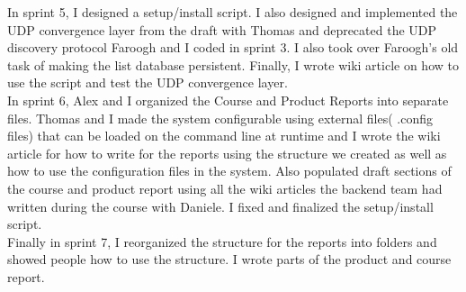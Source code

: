 In sprint 5,
I designed a setup/install script.
I also designed and implemented the UDP convergence layer from the draft with Thomas and deprecated the UDP discovery protocol Faroogh and I coded in sprint 3. 
I also took over Faroogh's old task of making the list database persistent. 
Finally, I wrote wiki article on how to use the script and test the UDP convergence layer. \\

In sprint 6,
Alex and I organized the Course and Product Reports into separate files.
Thomas and I made the system configurable using external files( .config files) that can be loaded on the command line at runtime and
I wrote the wiki article for how to write for the reports using the structure we created as well as how to use the configuration files in the system.
Also populated draft sections of the course and product report using all the wiki articles the backend team had written during the course with Daniele.
I fixed and finalized the setup/install script.\\

Finally in sprint 7,
I reorganized the structure for the reports into folders and showed people how to use the structure.
I wrote parts of the product and course report.\\
